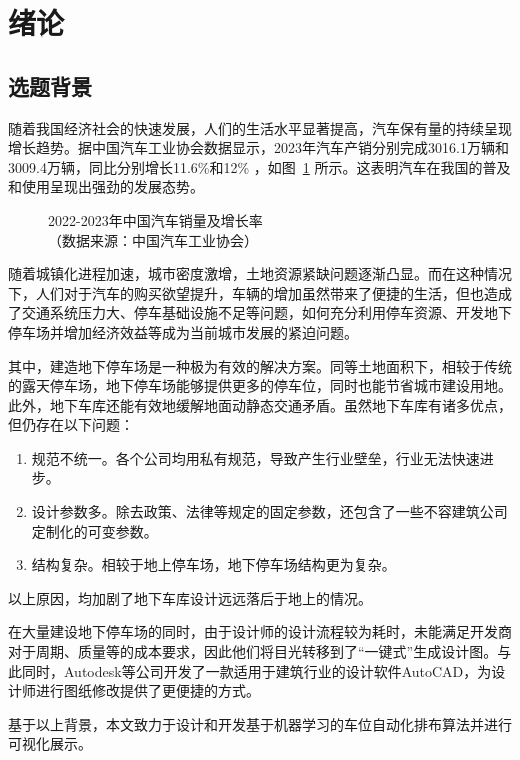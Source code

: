 \section{绪论}
\subsection{选题背景}
随着我国经济社会的快速发展，人们的生活水平显著提高，汽车保有量的持续呈现增长趋势。据中国汽车工业协会数据显示，2023年汽车产销分别完成3016.1万辆和3009.4万辆，同比分别增长11.6\%和12\% ，如图~\ref{fig:cars_sales} 所示。这表明汽车在我国的普及和使用呈现出强劲的发展态势。
\begin{figure}[!htb]
  \centering
  
  \caption{\label{fig:cars_sales}2022-2023年中国汽车销量及增长率\\（数据来源：中国汽车工业协会）}
\end{figure}

随着城镇化进程加速\cite{XXCZ202306017}，城市密度激增\cite{JZXB201004006}，土地资源紧缺问题逐渐凸显。而在这种情况下，人们对于汽车的购买欲望提升，车辆的增加虽然带来了便捷的生活，但也造成了交通系统压力大、停车基础设施不足等问题\cite{CSDQ200708009}，如何充分利用停车资源、开发地下停车场\cite{JSSD201905002}并增加经济效益等成为当前城市发展的紧迫问题。

其中，建造地下停车场是一种极为有效的解决方案。同等土地面积下，相较于传统的露天停车场，地下停车场能够提供更多的停车位\cite{1022811825.nh}，同时也能节省城市建设用地。此外，地下车库还能有效地缓解地面动静态交通矛盾\cite{CSDQ201807120}。虽然地下车库有诸多优点，但仍存在以下问题：
\begin{enumerate}
  \item 规范不统一。各个公司均用私有规范，导致产生行业壁垒，行业无法快速进步。
  \item 设计参数多。除去政策、法律等规定的固定参数\cite{ZGBZ202119043}，还包含了一些不容建筑公司定制化的可变参数。
  \item 结构复杂。相较于地上停车场，地下停车场结构更为复杂。
\end{enumerate}

以上原因，均加剧了地下车库设计远远落后于地上的情况。

在大量建设地下停车场的同时，由于设计师的设计流程较为耗时，未能满足开发商对于周期、质量等的成本要求，因此他们将目光转移到了“一键式”生成设计图。与此同时，Autodesk\cite{carrasco2005innovative,JCJG202304039}等公司开发了一款适用于建筑行业的设计软件AutoCAD，为设计师进行图纸修改提供了更便捷的方式。

基于以上背景，本文致力于设计和开发基于机器学习的车位自动化排布算法并进行可视化展示。
